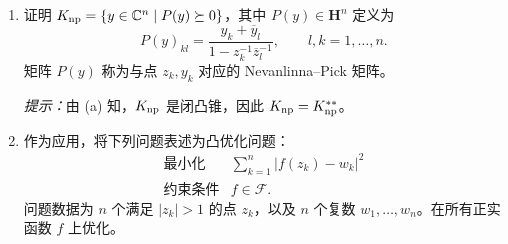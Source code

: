 \begin{enumerate}[label=(\alph*),start=4]
\item 证明 $K_{\rm np}=\{y\in\mathbb C^n\mid P(y)\succeq0\}$，其中 $P(y)\in\mathbf H^n$ 定义为
\[P(y)_{kl}=\frac{y_k+\overline y_l}{1-z_k^{-1}\overline z_l^{-1}},\qquad l,k=1,\ldots,n.\]
矩阵 $P(y)$ 称为与点 $z_k,y_k$ 对应的 Nevanlinna--Pick 矩阵。

\emph{提示：}由 (a) 知，$K_{\rm np}$ 是闭凸锥，因此 $K_{\rm np}=K_{\rm np}^{**}$。
\item 作为应用，将下列问题表述为凸优化问题：
\[\begin{array}{ll}\text{最小化}&\displaystyle\sum_{k=1}^n|f(z_k)-w_k|^2\\\text{约束条件}&f\in\mathcal F.\end{array}\]
问题数据为 $n$ 个满足 $|z_k|>1$ 的点 $z_k$，以及 $n$ 个复数 $w_1,\ldots,w_n$。在所有正实函数 $f$ 上优化。
\end{enumerate}


